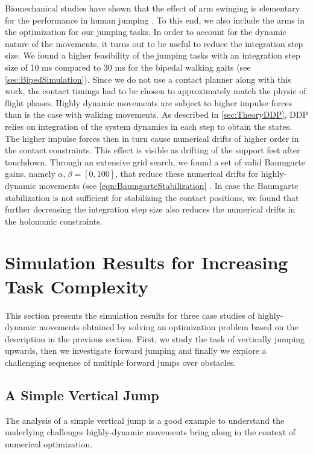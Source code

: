 Biomechanical studies have shown that the effect of arm swinging is elementary for the performance in human jumping \cite{harman1990effects}. To this end, we also include the arms in the optimization for our jumping tasks. 
In order to account for the dynamic nature of the movements, it turns out to be useful to reduce the integration step size. We found a higher feasibility of the jumping tasks with an integration step size of 10 ms compared to 30 ms for the bipedal walking gaits (see \cref{sec:BipedSimulation}). Since we do not use a contact planner along with this work, the contact timings had to be chosen to approximately match the physic of flight phases. 
Highly dynamic movements are subject to higher impulse forces than is the case with walking movements. As described in \ref{sec:TheoryDDP}, \gls{DDP} relies on integration of the system dynamics in each step to obtain the states. The higher impulse forces then in turn cause numerical drifts of higher order in the contact constraints. This effect is visible as drifting of the support feet after touchdown. Through an extensive grid search, we found a set of valid Baumgarte gains, namely $\alpha,\beta=[0,100]$, that reduce these numerical drifts for highly-dynamic movements (see \cref{eqn:BaumgarteStabilization} . In case the Baumgarte stabilization is not sufficient for stabilizing the contact positions, we found that further decreasing the integration step size also reduces the numerical drifts in the holonomic constraints.

\section{Simulation Results for Increasing Task Complexity}\label{sec:HighlySimulation}
This section presents the simulation results for three case studies of highly-dynamic movements obtained by solving an optimization problem based on the description in the previous section. First, we study the task of vertically jumping upwards, then we investigate forward jumping and finally we explore a challenging sequence of multiple forward jumps over obstacles.

\subsection{A Simple Vertical Jump}
The analysis of a simple vertical jump is a good example to understand the underlying challenges highly-dynamic movements bring along in the context of numerical optimization.

